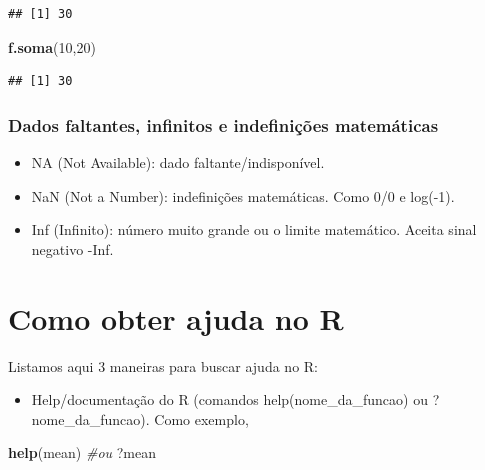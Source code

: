 \documentclass[
]{book}
\newenvironment{Shaded}{\begin{snugshade}}{\end{snugshade}}
\newcommand{\CommentTok}[1]{\textcolor[rgb]{0.56,0.35,0.01}{\textit{#1}}}
\newcommand{\DecValTok}[1]{\textcolor[rgb]{0.00,0.00,0.81}{#1}}
\newcommand{\KeywordTok}[1]{\textcolor[rgb]{0.13,0.29,0.53}{\textbf{#1}}}
\newcommand{\NormalTok}[1]{#1}
\providecommand{\tightlist}{%
  \setlength{\itemsep}{0pt}\setlength{\parskip}{0pt}}
\begin{document}
\begin{verbatim}
## [1] 30
\end{verbatim}

\begin{Shaded}
\begin{Highlighting}[]
\KeywordTok{f.soma}\NormalTok{(}\DecValTok{10}\NormalTok{,}\DecValTok{20}\NormalTok{)}
\end{Highlighting}
\end{Shaded}

\begin{verbatim}
## [1] 30
\end{verbatim}

\hypertarget{dados-faltantes-infinitos-e-indefiniuxe7uxf5es-matemuxe1ticas}{%
\subsubsection{Dados faltantes, infinitos e indefinições matemáticas}\label{dados-faltantes-infinitos-e-indefiniuxe7uxf5es-matemuxe1ticas}}

\begin{itemize}
\item
  NA (Not Available): dado faltante/indisponível.
\item
  NaN (Not a Number): indefinições matemáticas. Como 0/0 e log(-1).
\item
  Inf (Infinito): número muito grande ou o limite matemático. Aceita sinal negativo -Inf.
\end{itemize}

\hypertarget{como-obter-ajuda-no-r}{%
\section{Como obter ajuda no R}\label{como-obter-ajuda-no-r}}

Listamos aqui 3 maneiras para buscar ajuda no R:

\begin{itemize}
\tightlist
\item
  Help/documentação do R (comandos help(nome\_da\_funcao) ou ?nome\_da\_funcao). Como exemplo,
\end{itemize}

\begin{Shaded}
\begin{Highlighting}[]
\KeywordTok{help}\NormalTok{(mean) }\CommentTok{#ou}
\NormalTok{?mean}
\end{Highlighting}
\end{Shaded}
\end{document}
